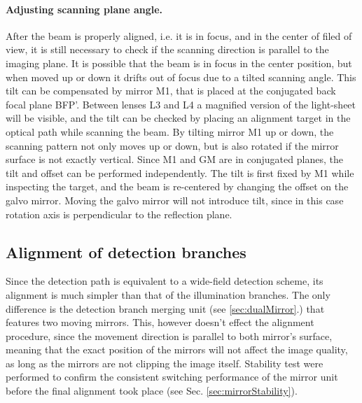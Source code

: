 

    \paragraph{Adjusting scanning plane angle.}
      After the beam is properly aligned, i.e. it is in focus, and in the center of filed of view, it is still necessary to check if the scanning direction is parallel to the imaging plane. It is possible that the beam is in focus in the center position, but when moved up or down it drifts out of focus due to a tilted scanning angle. This tilt can be compensated by mirror M1, that is placed at the conjugated back focal plane BFP'. Between lenses L3 and L4 a magnified version of the light-sheet will be visible, and the tilt can be checked by placing an alignment target in the optical path while scanning the beam. By tilting mirror M1 up or down, the scanning pattern not only moves up or down, but is also rotated if the mirror surface is not exactly vertical. Since M1 and GM are in conjugated planes, the tilt and offset can be performed independently. The tilt is first fixed by M1 while inspecting the target, and the beam is re-centered by changing the offset on the galvo mirror. Moving the galvo mirror will not introduce tilt, since in this case rotation axis is perpendicular to the reflection plane.




  \subsection{Alignment of detection branches}
    Since the detection path is equivalent to a wide-field detection scheme, its alignment is much simpler than that of the illumination branches. The only difference is the detection branch merging unit (see \autoref{sec:dualMirror}.) that features two moving mirrors. This, however doesn't effect the alignment procedure, since the movement direction is parallel to both mirror's surface, meaning that the exact position of the mirrors will not affect the image quality, as long as the mirrors are not clipping the image itself. Stability test were performed to confirm the consistent switching performance of the mirror unit before the final alignment took place (see Sec. \ref{sec:mirrorStability}).

